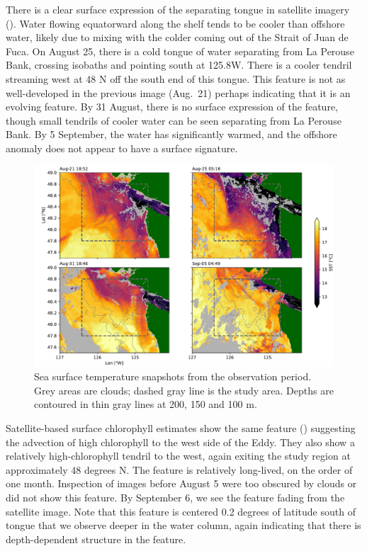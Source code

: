 \documentclass[draft]{agujournal2019}
\newcommand*{\Eddy}{{\sc Eddy}}
\begin{document}
There is a clear surface expression of the separating tongue in satellite imagery ().  Water flowing equatorward along the shelf tends to be cooler than offshore water, likely due to mixing with the colder coming out of the Strait of Juan de Fuca. On August 25, there is a cold tongue of water separating from La Perouse Bank, crossing isobaths and pointing south at 125.8\textdegree W.   There is a cooler tendril streaming west at 48 N off the south end of this tongue.  This feature is not as well-developed in the previous image (Aug.\ 21) perhaps indicating that it is an evolving feature.  By 31 August, there is no surface expression of the feature, though small tendrils of cooler water can be seen separating from La Perouse Bank.  By 5 September, the water has significantly warmed, and the offshore anomaly does not appear to have a surface signature.

\begin{figure}
  \begin{center}
    \includegraphics[width=6in]{SSTSnaps}
    \caption{Sea surface temperature snapshots from the observation period.  Grey areas are clouds; dashed gray line is the study area. Depths are contoured in thin gray lines at 200, 150 and 100 m. \cite{L2PMetopA}\label{fig:SST}}
  \end{center}
\end{figure}

Satellite-based surface chlorophyll estimates show the same feature () suggesting the advection of high chlorophyll to the west side of the \Eddy. They also show a relatively high-chlorophyll tendril to the west, again exiting the study region at approximately 48 degrees N.  The feature is relatively long-lived, on the order of one month.  Inspection of images before August 5 were too obscured by clouds or did not show this feature.  By September 6, we see the feature fading from the satellite image.  Note that this feature is centered 0.2 degrees of latitude south of tongue that we observe deeper in the water column, again indicating that there is depth-dependent structure in the feature.
\end{document}
